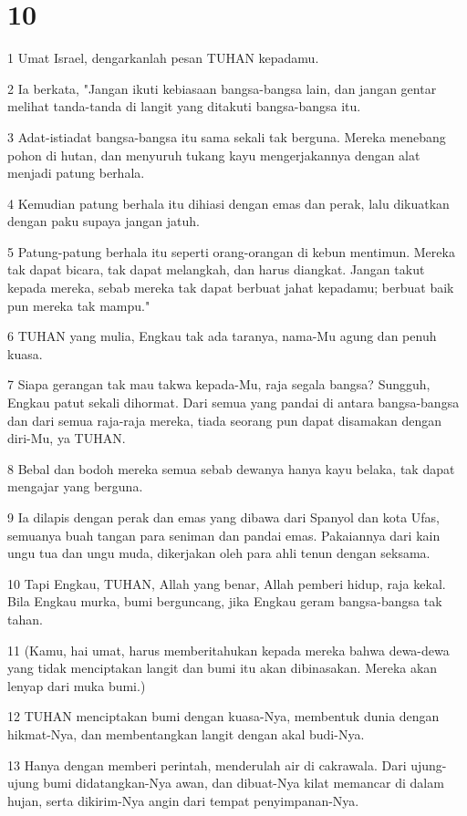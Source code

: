 \chapter{10}

\par 1 Umat Israel, dengarkanlah pesan TUHAN kepadamu.
\par 2 Ia berkata, "Jangan ikuti kebiasaan bangsa-bangsa lain, dan jangan gentar melihat tanda-tanda di langit yang ditakuti bangsa-bangsa itu.
\par 3 Adat-istiadat bangsa-bangsa itu sama sekali tak berguna. Mereka menebang pohon di hutan, dan menyuruh tukang kayu mengerjakannya dengan alat menjadi patung berhala.
\par 4 Kemudian patung berhala itu dihiasi dengan emas dan perak, lalu dikuatkan dengan paku supaya jangan jatuh.
\par 5 Patung-patung berhala itu seperti orang-orangan di kebun mentimun. Mereka tak dapat bicara, tak dapat melangkah, dan harus diangkat. Jangan takut kepada mereka, sebab mereka tak dapat berbuat jahat kepadamu; berbuat baik pun mereka tak mampu."
\par 6 TUHAN yang mulia, Engkau tak ada taranya, nama-Mu agung dan penuh kuasa.
\par 7 Siapa gerangan tak mau takwa kepada-Mu, raja segala bangsa? Sungguh, Engkau patut sekali dihormat. Dari semua yang pandai di antara bangsa-bangsa dan dari semua raja-raja mereka, tiada seorang pun dapat disamakan dengan diri-Mu, ya TUHAN.
\par 8 Bebal dan bodoh mereka semua sebab dewanya hanya kayu belaka, tak dapat mengajar yang berguna.
\par 9 Ia dilapis dengan perak dan emas yang dibawa dari Spanyol dan kota Ufas, semuanya buah tangan para seniman dan pandai emas. Pakaiannya dari kain ungu tua dan ungu muda, dikerjakan oleh para ahli tenun dengan seksama.
\par 10 Tapi Engkau, TUHAN, Allah yang benar, Allah pemberi hidup, raja kekal. Bila Engkau murka, bumi berguncang, jika Engkau geram bangsa-bangsa tak tahan.
\par 11 (Kamu, hai umat, harus memberitahukan kepada mereka bahwa dewa-dewa yang tidak menciptakan langit dan bumi itu akan dibinasakan. Mereka akan lenyap dari muka bumi.)
\par 12 TUHAN menciptakan bumi dengan kuasa-Nya, membentuk dunia dengan hikmat-Nya, dan membentangkan langit dengan akal budi-Nya.
\par 13 Hanya dengan memberi perintah, menderulah air di cakrawala. Dari ujung-ujung bumi didatangkan-Nya awan, dan dibuat-Nya kilat memancar di dalam hujan, serta dikirim-Nya angin dari tempat penyimpanan-Nya.
